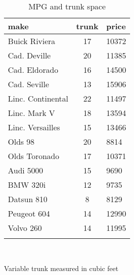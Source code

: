 \documentclass{article}
\begin{document}
\begin{table}[tbp] \centering
{}

\caption{MPG and trunk space}
\begin{tabularx}{\linewidth}{lcR}

\toprule
{make}&{trunk}&{price} \tabularnewline
\midrule \addlinespace[\belowrulesep]
Buick Riviera&17&10372 \tabularnewline
Cad. Deville&20&11385 \tabularnewline
Cad. Eldorado&16&14500 \tabularnewline
Cad. Seville&13&15906 \tabularnewline
Linc. Continental&22&11497 \tabularnewline
Linc. Mark V&18&13594 \tabularnewline
Linc. Versailles&15&13466 \tabularnewline
Olds 98&20&8814 \tabularnewline
Olds Toronado&17&10371 \tabularnewline
Audi 5000&15&9690 \tabularnewline
BMW 320i&12&9735 \tabularnewline
Datsun 810&8&8129 \tabularnewline
Peugeot 604&14&12990 \tabularnewline
Volvo 260&14&11995 \tabularnewline
\bottomrule \addlinespace[\belowrulesep]

\end{tabularx}
\\ \parbox{\linewidth}{\footnotesize Variable trunk measured in cubic feet}
\end{table}
\end{document}
